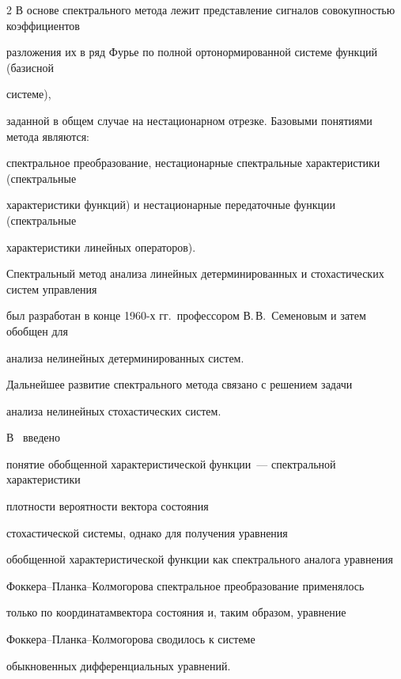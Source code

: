 \begin{multicols}{2}
В основе спектрального метода лежит пред\-став\-ле\-ние сигналов совокупностью коэффициентов 


разложения их в ряд Фурье по полной ортонормированной системе функций (базисной\linebreak


 системе), 


заданной в общем случае на нестационарном отрезке. Базовыми понятиями метода являются: 


спектральное преобразование, нестационарные спектральные характеристики (спектральные 


характеристики функций) и нестационарные передаточные функции (спектральные 


характеристики линейных операторов).





Спектральный метод анализа линейных де\-терминированных и стохастических систем управ\-ления 


был разработан в конце 1960-х гг.\ профес\-сором В.\,В.~Семеновым и затем обобщен для\linebreak 


анализа нелинейных детерминированных сис\-тем. 


Дальнейшее развитие спектрального метода связано с решением задачи 


анализа нелинейных стохастических систем. 





В~\cite{Sem_OHF_SPI_77} введено 


понятие обобщенной характеристической функции~--- спектральной характеристики 


плотности вероятности вектора состояния\linebreak


 стохастической системы, однако для получения уравнения 


обобщенной характеристической функции как спектрального аналога уравнения 


Фок\-ке\-ра--План\-ка--Кол\-мо\-го\-ро\-ва спектральное преобразование применялось 


только по координатам\linebreak вектора состояния и, таким образом, уравнение 


Фок\-ке\-ра--План\-ка--Кол\-мо\-го\-ро\-ва сводилось к сис\-те\-ме 


обыкновенных дифференциальных уравнений. 






\end{multicols}
